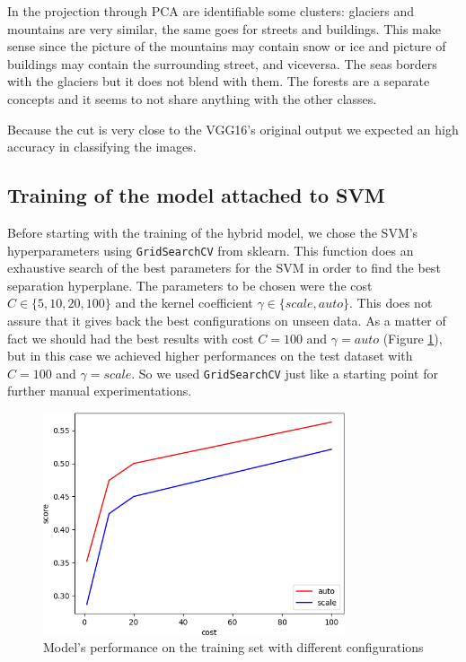 \documentclass[compsoc]{IEEEtran}
\begin{document}
In the projection through PCA are identifiable some clusters: glaciers and mountains are very similar, the same goes for streets and buildings. This make sense since the picture of the mountains may contain snow or ice and picture of buildings may contain the surrounding street, and viceversa. The seas borders with the glaciers but it does not blend with them. The forests are a separate concepts and it seems to not share anything with the other classes. \par
Because the cut is very close to the VGG16's original output we expected an high accuracy in classifying the images.
\subsection{Training of the model attached to SVM}
Before starting with the training of the hybrid model, we chose the SVM's hyperparameters using \texttt{GridSearchCV} from sklearn. This function does an exhaustive search of the best parameters for the SVM in order to find the best separation hyperplane. The parameters to be chosen were the cost $C \in \{5, 10, 20, 100\}$ and the kernel coefficient $\gamma \in \{scale, auto\}$. This does not assure that it gives back the best configurations on unseen data. As a matter of fact we should had the best results with cost $C=100$ and $\gamma=auto$ (Figure \ref{fig:costs}), but in this case we achieved higher performances on the test dataset with $C=100$ and $\gamma=scale$. So we used \texttt{GridSearchCV} just like a starting point for further manual experimentations.

\begin{figure}[ht!]
\centering                                                                        
\includegraphics[width=3.5in]{../images/costs.png}
\captionsetup{justification=centering}                                                                                         
\caption{Model's performance on the training set with different configurations}
\label{fig:costs}                                                                                                                               
\end{figure}
\end{document}
